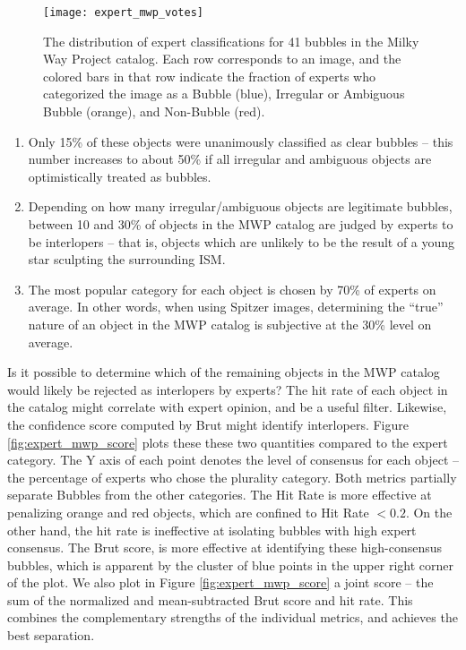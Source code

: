 \documentclass[preprint]{aastex}
\begin{document}
\begin{figure}
\texttt{[image: expert\_mwp\_votes]}
\caption{The distribution of expert classifications for 41 bubbles in the Milky Way Project catalog. Each row corresponds to an image, and the colored bars in that row indicate the fraction of experts who categorized the image as a Bubble (blue), Irregular or Ambiguous Bubble (orange), and Non-Bubble (red).}
\label{fig:expert_mwp_votes}
\end{figure}

\begin{enumerate} 
\item Only 15\% of these objects were unanimously classified as clear bubbles -- this number increases to about 50\% if all irregular and ambiguous objects are optimistically treated as bubbles. 
\item Depending on how many irregular/ambiguous objects are legitimate bubbles, between 10 and 30\% of objects in the MWP catalog are judged by experts to be interlopers -- that is, objects which are unlikely to be the result of a young star sculpting the surrounding ISM.
\item The most popular category for each object is chosen by 70\% of experts on average. In other words, when using Spitzer images, determining the ``true'' nature of an object in the MWP catalog is subjective at the 30\% level on average.
\end{enumerate}

Is it possible to determine which of the remaining objects in the MWP catalog would likely be rejected as interlopers by experts? The hit rate of each object in the catalog might correlate with expert opinion, and be a useful filter. Likewise, the confidence score computed by Brut might identify interlopers. Figure \ref{fig:expert_mwp_score} plots these these two quantities compared to the expert category. The Y axis of each point denotes the level of consensus for each object -- the percentage of experts who chose the plurality category. Both metrics partially separate Bubbles from the other categories. The Hit Rate is more effective at penalizing orange and red objects, which are confined to Hit Rate $<0.2$. On the other hand, the hit rate is ineffective at isolating bubbles with high expert consensus. The Brut score, is more effective at identifying these high-consensus bubbles, which is apparent by the cluster of blue points in the upper right corner of the plot. We also plot in Figure \ref{fig:expert_mwp_score} a joint score -- the sum of the normalized and mean-subtracted Brut score and hit rate.  This combines the complementary strengths of the individual metrics, and achieves the best separation.
\end{document}
